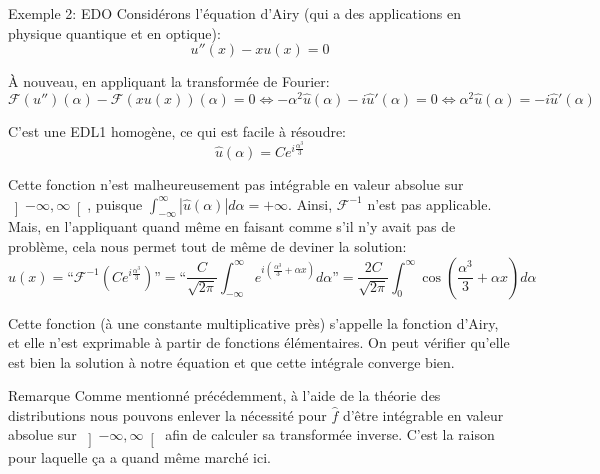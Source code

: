 \documentclass[a4paper]{article}
\begin{document}
\begin{parag}{Exemple 2: EDO}
    Considérons l'équation d'Airy (qui a des applications en physique quantique et en optique): 
    \[u''\left(x\right) - xu\left(x\right) = 0\]
    
    À nouveau, en appliquant la transformée de Fourier: 
    \[\mathcal{F}\left(u''\right)\left(\alpha\right) - \mathcal{F}\left(x u\left(x\right)\right)\left(\alpha\right) = 0 \iff -\alpha ^2 \hat{u}\left(\alpha\right) - i \hat{u}'\left(\alpha\right) = 0 \iff \alpha ^2 \hat{u}\left(\alpha\right) = -i \hat{u}'\left(\alpha\right)\]
    
    C'est une EDL1 homogène, ce qui est facile à résoudre: 
    \[\hat{u}\left(\alpha\right) = Ce^{i \frac{\alpha^3}{3}}\]
    
    Cette fonction n'est malheureusement pas intégrable en valeur absolue sur $\left]-\infty, \infty\right[ $, puisque $\int_{-\infty}^{\infty} \left|\hat{u}\left(\alpha\right)\right| d \alpha = +\infty$. Ainsi, $\mathcal{F}^{-1}$ n'est pas applicable. Mais, en l'appliquant quand même en faisant comme s'il n'y avait pas de problème, cela nous permet tout de même de deviner la solution: 
    \[u\left(x\right) = \text{``}\mathcal{F}^{-1} \left(C e^{i \frac{\alpha^3}{3}}\right)\text{''} =  \text{``}\frac{C}{\sqrt{2\pi}} \int_{-\infty}^{\infty} e^{i \left(\frac{\alpha^3}{3} + \alpha x\right)} d\alpha \text{''} = \frac{2C}{\sqrt{2\pi}} \int_{0}^{\infty} \cos\left(\frac{\alpha^3}{3} + \alpha x\right)d \alpha\]

    Cette fonction (à une constante multiplicative près) s'appelle la fonction d'Airy, et elle n'est exprimable à partir de fonctions élémentaires. On peut vérifier qu'elle est bien la solution à notre équation et que cette intégrale converge bien.

    \begin{subparag}{Remarque}
        Comme mentionné précédemment, à l'aide de la théorie des distributions nous pouvons enlever la nécessité pour $\hat{f}$ d'être intégrable en valeur absolue sur $\left]-\infty, \infty\right[ $ afin de calculer sa transformée inverse. C'est la raison pour laquelle ça a quand même marché ici.
    \end{subparag}
\end{parag}
\end{document}
